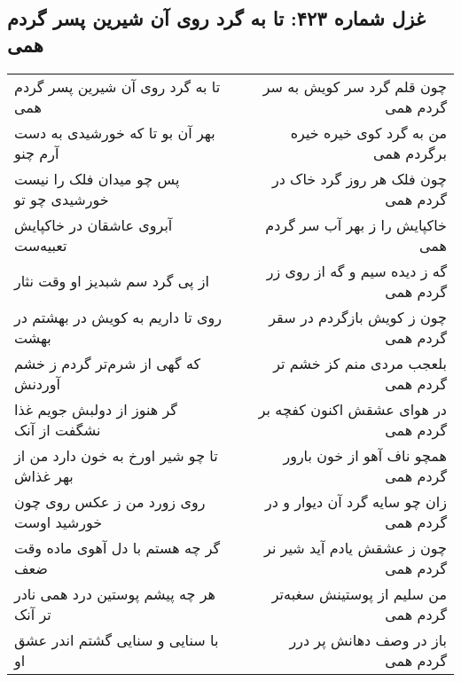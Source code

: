 \begin{center}
\section*{غزل شماره ۴۲۳: تا به گرد روی آن شیرین پسر گردم همی}
\label{sec:423}
\begin{longtable}{l p{0.5cm} r}
تا به گرد روی آن شیرین پسر گردم همی
&&
چون قلم گرد سر کویش به سر گردم همی
\\
بهر آن بو تا که خورشیدی به دست آرم چنو
&&
من به گرد کوی خیره خیره برگردم همی
\\
پس چو میدان فلک را نیست خورشیدی چو تو
&&
چون فلک هر روز گرد خاک در گردم همی
\\
آبروی عاشقان در خاکپایش تعبیه‌ست
&&
خاکپایش را ز بهر آب سر گردم همی
\\
از پی گرد سم شبدیز او وقت نثار
&&
گه ز دیده سیم و گه از روی زر گردم همی
\\
روی تا داریم به کویش در بهشتم در بهشت
&&
چون ز کویش بازگردم در سقر گردم همی
\\
که گهی از شرم‌تر گردم ز خشم آوردنش
&&
بلعجب مردی منم کز خشم تر گردم همی
\\
گر هنوز از دولبش جویم غذا نشگفت از آنک
&&
در هوای عشقش اکنون کفچه بر گردم همی
\\
تا چو شیر اورخ به خون دارد من از بهر غذاش
&&
همچو ناف آهو از خون بارور گردم همی
\\
روی زورد من ز عکس روی چون خورشید اوست
&&
زان چو سایه گرد آن دیوار و در گردم همی
\\
گر چه هستم با دل آهوی ماده وقت ضعف
&&
چون ز عشقش یادم آید شیر نر گردم همی
\\
هر چه پیشم پوستین درد همی نادر تر آنک
&&
من سلیم از پوستینش سغبه‌تر گردم همی
\\
با سنایی و سنایی گشتم اندر عشق او
&&
باز در وصف دهانش پر درر گردم همی
\\
\end{longtable}
\end{center}
